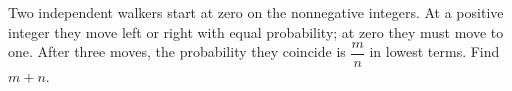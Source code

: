 Two independent walkers start at zero on the nonnegative integers. At a positive integer they move left or right with equal probability; at zero they must move to one. After three moves, the probability they coincide is $\dfrac{m}{n}$ in lowest terms. Find $m+n$.
